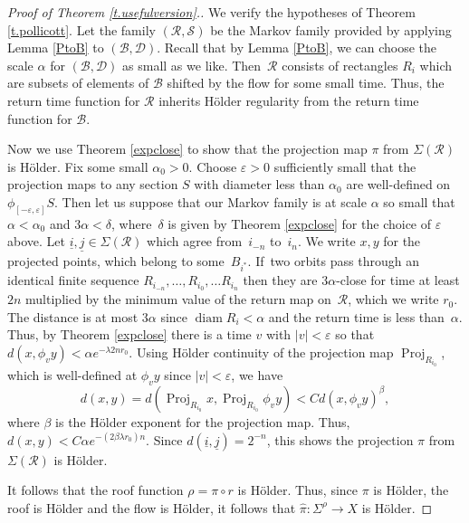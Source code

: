 \documentclass[JEP,XML,SOM,Unicode,NoFloatCountersInSection]{cedram}
\let\mathcal\mathscr
\let\epsilon\varepsilon
\theoremstyle{definition}
\numberwithin{equation}{section}
\DeclareMathOperator{\diam}{diam}
\DeclareMathOperator{\Proj}{Proj}
\newcommand\DDD{\mathcal D}
\newcommand\BBB{\mathcal B}
\newcommand\RRR{\mathcal R}
\newcommand\SSS{\mathcal S}
\begin{document}
\begin{proof}[Proof of Theorem \ref{t.usefulversion}.]

We verify the hypotheses of Theorem \ref{t.pollicott}. Let the family $(\RRR, \SSS)$ be the Markov family provided by applying Lemma \ref{PtoB} to $(\BBB, \DDD)$. Recall that by Lemma \ref{PtoB}, we can choose the scale $\alpha$ for $(\BBB, \DDD)$ as small as we like. Then~$\RRR$ consists of rectangles $R_i$ which are subsets of elements of $\BBB$ shifted by the flow for some small time. Thus, the return time function for $\RRR$ inherits Hölder regularity from the return time function for $\BBB$.

Now we use Theorem \ref{expclose} to show that the projection map $\pi$ from $\Sigma(\RRR)$ is Hölder. Fix some small $\alpha_0>0$. Choose $\epsilon>0$ sufficiently small that the projection maps to any section $S$ with diameter less than $\alpha_0$ are well-defined on $\phi_{[-\epsilon,\epsilon]}S$. Then let us suppose that our Markov family is at scale $\alpha$ so small that $\alpha<\alpha_0$ and $3\alpha < \delta$, where~$\delta$ is given by Theorem \ref{expclose} for the choice of $\epsilon$ above. Let $\underline i, \underline j \in \Sigma(\RRR)$ which agree from~$i_{-n}$ to~$i_n$. We write $x, y$ for the projected points, which belong to some~$B_{i^*}$. If~two orbits pass through an identical finite sequence $R_{i_{-n}}, \ldots, R_{i_0}, \ldots R_{i_n}$ then they are $3\alpha$-close for time at least $2n$ multiplied by the minimum value of the return map on~$\RRR$, which we write $r_0$. The distance is at most $3 \alpha$ since $\diam R_i < \alpha$ and the return time is less than~$\alpha$. Thus, by Theorem \ref{expclose} there is a time $v$ with $|v|<\epsilon$ so that $d(x, \phi_v y)< \alpha e^{-\lambda 2nr_0}$. Using Hölder continuity of the projection map $\Proj_{R_{i_0}}$, which is well-defined at $\phi_vy$ since $|v|<\epsilon$, we have
\[
d(x,y) = d(\Proj_{R_{i_0}}x, \Proj_{R_{i_0}}\phi_v y)< Cd(x, \phi_vy)^\beta,
\]
where $\beta$ is the Hölder exponent for the projection map. Thus, $d(x,y) < C\alpha e^{-(2\beta \lambda r_0) n}$. Since $d(\underline i, \underline j) = 2^{-n}$, this shows the projection $\pi$ from $\Sigma(\RRR)$ is Hölder.

It follows that the roof function $\rho = \pi \circ r$ is Hölder. Thus, since $\pi$ is Hölder, the roof is Hölder and the flow is Hölder, it follows that $\hat \pi: \Sigma^\rho \to X$ is Hölder.
\end{proof}
\end{document}
